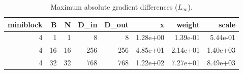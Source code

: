 \begin{table}
\caption{Maximum absolute gradient differences ($L_\infty$).}
\label{tab:max_grad}
\begin{tabular}{rrrrr|rrr}
\toprule
miniblock & B & N & D_in & D_out & x & weight & scale \\
\midrule
4 & 1 & 1 & 8 & 8 & 1.28e+00 & 1.39e-01 & 5.44e-01 \\
4 & 16 & 16 & 256 & 256 & 4.85e+01 & 2.14e+01 & 1.40e+03 \\
4 & 32 & 32 & 768 & 768 & 1.22e+02 & 7.27e+01 & 8.49e+03 \\
\bottomrule
\end{tabular}
\end{table}
